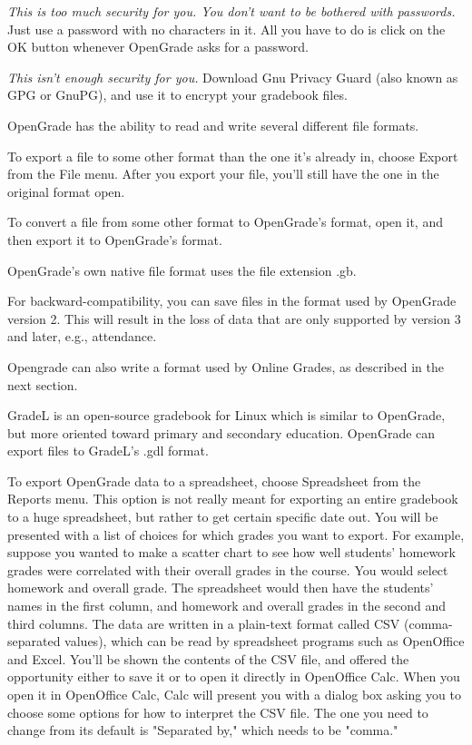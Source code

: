 \documentclass{opengrade_doc}
\begin{document}
\emph{This is too much security for you.
You don't want to be bothered with passwords.\/}
Just use a password with no characters in it. All you have to do is
click on the OK button whenever OpenGrade asks for a password.

\emph{This isn't enough security for you.\/}
Download Gnu Privacy Guard (also known as GPG or GnuPG), and use it
to encrypt your gradebook files.

\label{import-export}
OpenGrade has the ability to read and write several different file formats.

To export a file to some other format than the one it's already in, choose Export
from the File menu. After you export your file, you'll still have the one in the
original format open.

To convert a file from some other format to OpenGrade's format, open it, and then
export it to OpenGrade's format.


OpenGrade's own native file format uses the file extension .gb. 


For backward-compatibility, you can save files in the format used by OpenGrade version 2.
This will result in the loss of data that are only supported by version 3 and later, e.g., attendance.


Opengrade can also write a format used by Online Grades, as described in the next
section.


GradeL is an open-source gradebook for Linux which is similar to OpenGrade, but more
oriented toward primary and secondary education. OpenGrade can export files to
GradeL's .gdl format.


To export OpenGrade data to a spreadsheet, choose Spreadsheet from the Reports menu.
This option is not really meant for exporting an entire gradebook to a huge spreadsheet,
but rather to get certain specific date out. You will be presented with a list of
choices for which grades you want to export. For example, suppose you wanted to
make a scatter chart to see how well students' homework grades were correlated with
their overall grades in the course. You would select homework and overall grade.
The spreadsheet would then have the students' names in the first column, and homework
and overall grades in the second and third columns. The data are written in a plain-text
format called CSV (comma-separated values), which can be read by spreadsheet programs
such as OpenOffice and Excel. You'll be shown the contents of the CSV file, and offered
the opportunity either to save it or to open it directly in OpenOffice Calc. When you
open it in OpenOffice Calc, Calc will present you with a dialog box asking you to choose
some options for how to interpret the CSV file. The one you need to change from its
default is "Separated by," which needs to be "comma."
\end{document}
